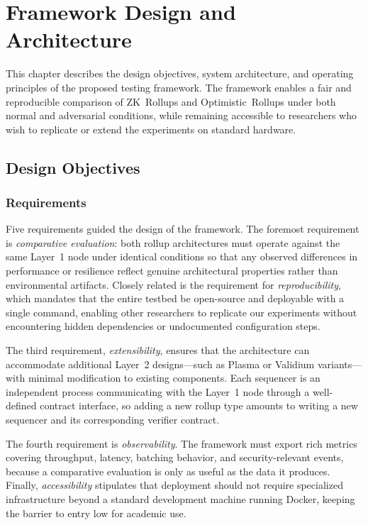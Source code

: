 \chapter{Framework Design and Architecture}
\label{ch:framework}

This chapter describes the design objectives, system architecture, and operating principles of the proposed testing framework. The framework enables a fair and reproducible comparison of ZK~Rollups and Optimistic~Rollups under both normal and adversarial conditions, while remaining accessible to researchers who wish to replicate or extend the experiments on standard hardware.

\section{Design Objectives}

\subsection{Requirements}

Five requirements guided the design of the framework. The foremost requirement is \textit{comparative evaluation}: both rollup architectures must operate against the same Layer~1 node under identical conditions so that any observed differences in performance or resilience reflect genuine architectural properties rather than environmental artifacts. Closely related is the requirement for \textit{reproducibility}, which mandates that the entire testbed be open-source and deployable with a single command, enabling other researchers to replicate our experiments without encountering hidden dependencies or undocumented configuration steps.

The third requirement, \textit{extensibility}, ensures that the architecture can accommodate additional Layer~2 designs---such as Plasma or Validium variants---with minimal modification to existing components. Each sequencer is an independent process communicating with the Layer~1 node through a well-defined contract interface, so adding a new rollup type amounts to writing a new sequencer and its corresponding verifier contract.

The fourth requirement is \textit{observability}. The framework must export rich metrics covering throughput, latency, batching behavior, and security-relevant events, because a comparative evaluation is only as useful as the data it produces. Finally, \textit{accessibility} stipulates that deployment should not require specialized infrastructure beyond a standard development machine running Docker, keeping the barrier to entry low for academic use.

